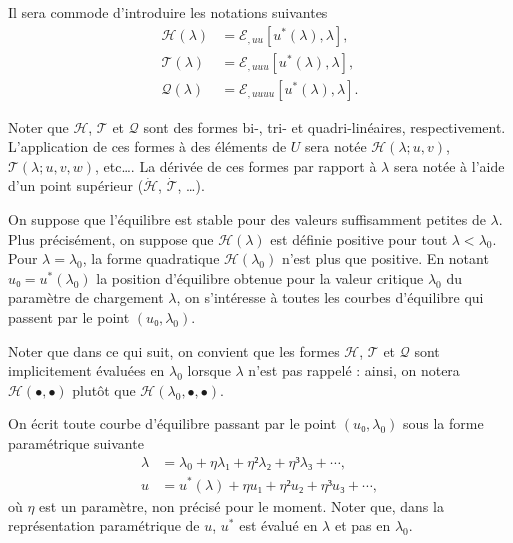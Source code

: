 \documentclass[12pt, final]{amsart}
\begin{document}
Il sera commode d'introduire les notations suivantes
\begin{align}
  \mathcal H(\lambda)&=ℰ_{,uu}[u^\ast(\lambda), \lambda],\\
  \mathcal T(\lambda)&=ℰ_{,uuu}[u^\ast(\lambda), \lambda],\\
  \mathcal Q(\lambda)&=ℰ_{,uuuu}[u^\ast(\lambda), \lambda].
\end{align}

Noter que \(\mathcal H\), \(\mathcal T\) et \(\mathcal Q\) sont des formes bi-,
tri- et quadri-linéaires, respectivement. L'application de ces formes à des
éléments de \(U\) sera notée \(\mathcal H(\lambda; u, v)\),
\(\mathcal T(\lambda; u, v, w)\), etc\dots. La dérivée de ces formes par
rapport à \(\lambda\) sera notée à l'aide d'un point supérieur
(\(\dot{\mathcal H}\), \(\dot{\mathcal T}\), \dots).

On suppose que l'équilibre est stable pour des valeurs suffisamment petites de
\(\lambda\). Plus précisément, on suppose que \(\mathcal H(\lambda)\) est
définie positive pour tout \(\lambda<\lambda_0\). Pour \(\lambda=\lambda_0\),
la forme quadratique \(\mathcal H(\lambda_0)\) n'est plus que positive. En
notant \(u₀=u^\ast(\lambda_0)\) la position d'équilibre obtenue pour la valeur
critique \(\lambda_0\) du paramètre de chargement \(\lambda\), on s'intéresse à
toutes les courbes d'équilibre qui passent par le point \((u₀, \lambda_0)\).

Noter que dans ce qui suit, on convient que les formes \(\mathcal H\),
\(\mathcal T\) et \(\mathcal Q\) sont implicitement évaluées en \(\lambda_0\)
lorsque \(\lambda\) n'est pas rappelé : ainsi, on notera
\(\mathcal H(•, •)\) plutôt que
\(\mathcal H(\lambda_0, •, •)\).

On écrit toute courbe d'équilibre passant par le point \((u₀, \lambda_0)\)
sous la forme paramétrique suivante
\begin{align}
  \label{eq:20211115075817}
  \lambda&=\lambda_0+η\lambda₁+η²\lambda₂+η³\lambda₃+\cdots,\\
  \label{eq:20211115075835}
  u&=u^\ast(\lambda)+η u₁+η² u₂+η³u₃+\cdots,
\end{align}
où \(η\) est un paramètre, non précisé pour le moment. Noter que, dans la
représentation paramétrique de \(u\), \(u^\ast\) est évalué en \(\lambda\) et
pas en \(\lambda_0\).
\end{document}
